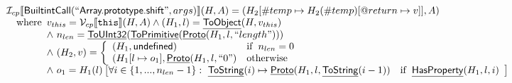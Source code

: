 \documentclass{article}
\makeatletter
\newcommand{\SF}[1]{\mbox{\textsf{#1}}}
\newcommand{\TT}[1]{\mbox{\texttt{#1}}}
\newcommand{\wherec}[1]{{\rm where}\begin{array}[t]{l}#1\end{array}}
\newcommand{\ifc}[1]{{\rm if}\begin{array}[t]{l}#1\end{array}}
\newcommand{\owc}{{\rm otherwise}}
\newcommand{\I}{\mathcal{I}}
\newcommand{\V}{\mathcal{V}}
\newcommand{\lbr}{\llbracket}
\newcommand{\rbr}{\rrbracket}
\newcommand{\hf}[1]{\underline{\sf #1}}
\newcommand{\varloc}[1]{\##1}
\newcommand{\varprop}[1]{@#1}
\makeatother
\begin{document}
\[\begin{array}{l}
\I _{cp}\lbr \SF{BuiltintCall}(``\SF{Array.prototype.shift}",args)\rbr(H,A)
 = (H_2[\varloc{temp}\mapsto H_2(\varloc{temp})[\varprop{return}\mapsto v]], A) \\
\quad\wherec{
  v_{this} = \V _{cp}\lbr \TT{this}\rbr (H,A) \land (H_1,l) = \hf{ToObject}(H,v_{this})\\
  \land\ n_{len} = \hf{ToUInt32}(\hf{ToPrimitive}(\hf{Proto}(H_1, l, ``length")))\\
  \land\ (H_2,v) = \left\{\begin{array}{ll}
    (H_1,\SF{undefined}) &  \ifc{n_{len} = 0}\\
    (H_1[l \mapsto o_1], \hf{Proto}(H_1, l, ``0")& \owc
    \end{array}\right.\\
  \land\ o_1 = H_1(l)\left[\forall i \in \{1,...,n_{len}-1\}: \
      \hf{ToString}(i) \mapsto \hf{Proto}(H_1, l, \hf{ToString}(i-1))\quad\ifc{\hf{HasProperty}(H_1, l, i)}\right]\\
  }\\
\\\\
\end{array}
\]
\end{document}
